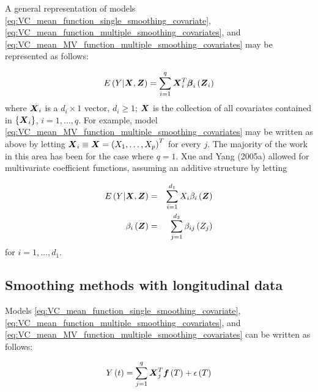 \documentclass[12pt]{article}
\newcommand{\bfbeta}{\mbox{\boldmath $\beta$}}
\newcommand{\bff}{\mbox{\boldmath $f$}}
\newcommand{\bfX}{\mbox{\boldmath $X$}}
\newcommand{\bfZ}{\mbox{\boldmath $Z$}}
\begin{document}
{A general representation of models \ref{eq:VC_mean_function_single_smoothing_covariate}, \ref{eq:VC_mean_function_multiple_smoothing_covariates}, and \ref{eq:VC_mean_MV_function_multiple_smoothing_covariates} may be represented as follows:

\begin{equation} \label{eq:general_VC_model}
E\left(Y \vert \bfX, \bfZ\right) = \sum_{i=1}^q \bfX_i^T \bfbeta_i\left(\bfZ_i\right)
\end{equation}
\noindent
where $\bfX_i$ is a $d_i \times 1$ vector, $d_i \ge 1$; $\bfX$ is the collection of all covariates contained in $\left\{ \bfX_i \right\}$, $i=1,\dots,q$. For example, model \ref{eq:VC_mean_MV_function_multiple_smoothing_covariates} may be written as above by letting $\bfX_i \equiv \bfX = \left(X_1,\dots, X_p\right)^T$ for every $j$. The majority of the work in this area has been for the case where $q=1$.  Xue and Yang (2005a) allowed for multivariate coefficient functions, assuming an additive structure by letting

\begin{eqnarray} 
E\left(Y \vert \bfX, \bfZ\right) &=& \sum_{i=1}^{d_1} X_i \beta_i\left(\bfZ\right) \label{eq:xue_VC_model}\\
\beta_i\left(\bfZ\right) &=& \sum_{j=1}^{d_2} \beta_{ij}\left(Z_j\right) \nonumber
\end{eqnarray}
\noindent
for $i=1,\dots, d_1$.

 

















\subsection{Smoothing methods with longitudinal data}

Models \ref{eq:VC_mean_function_single_smoothing_covariate}, \ref{eq:VC_mean_function_multiple_smoothing_covariates}, and \ref{eq:VC_mean_MV_function_multiple_smoothing_covariates} can be written as follows:

\begin{equation} \label{eq:functional_VC_model}
Y\left(t\right) = \sum_{j=1}^q \bfX_j^T \bff \left(T\right) + \epsilon\left(T\right)
\end{equation}

}
\end{document}
